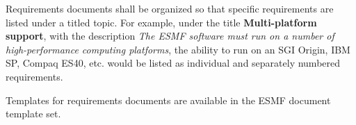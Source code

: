 
Requirements documents shall be organized so that specific requirements are
listed under a titled topic.  For example, under the title {\bf Multi-platform 
support}, with the description {\it The ESMF software must run on a number of high-performance
computing platforms}, the ability to run on an SGI Origin, IBM SP,
Compaq ES40, etc. would be listed as individual and separately numbered 
requirements.   

Templates for requirements documents are available in the ESMF document
template set.










